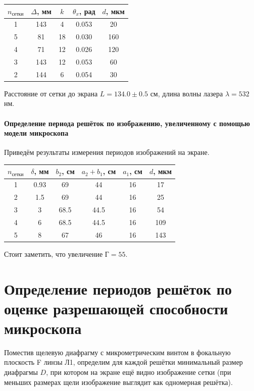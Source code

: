 \documentclass[12pt]{article}
\begin{document}
\begin{table}[h!]
	\centering
	\begin{tabular}{|c|c|c|c|c|}
	\hline
		$n_\text{сетки}$ & $\Delta$, мм & $k$ & $\theta_x$, рад & $d$, мкм\\
	\hline
		1 & 143 & 4 & 0.053 & 20\\
	\hline
		5 & 81 & 18 & 0.030 & 160\\
	\hline
		4 & 71 & 12 & 0.026 & 120\\
	\hline
		3 & 143 & 12 & 0.053 & 60\\
	\hline
		2 & 144 & 6 & 0.054 & 30\\		 	
	\hline
	\end{tabular}
\end{table}
\par
	Расстояние от сетки до экрана $L = 134.0 \pm 0.5$ см, длина волны лазера $\lambda = 532$ нм.
	
\paragraph*{Определение периода решёток по изображению, увеличенному с помощью модели микроскопа}
\par
	Приведём результаты измерения периодов изображений на экране.

\begin{table}[h!]
	\centering
	\begin{tabular}{|c|c|c|c|c|c|}
	\hline
		$n_\text{сетки}$ & $\delta$, мм & $b_2$, см & $a_2 + b_1$, см & $a_1$, см & $d$, мкм\\
	\hline
		1 & 0.93 & 69 & 44 & 16 & 17\\
	\hline
		2 & 1.5 & 69 & 44 & 16 & 25 \\
	\hline
		3 & 3 & 68.5 & 44.5 & 16 & 54  \\
	\hline
		4 & 6 & 68.5 & 44.5 & 16 & 109\\
	\hline
		5 & 8 & 67 & 46 & 16 & 143\\		 	
	\hline
	\end{tabular}
\end{table}
\par
	Стоит заметить, что увеличение $Г = 55$.

\section*{Определение периодов решёток по оценке разрешающей способности микроскопа}
\par
	Поместив щелевую диафрагму с микрометрическим винтом в фокальную плоскость F линзы Л1, определим для каждой решётки минимальный размер диафрагмы $D$, при котором на экране ещё видно изображение сетки (при меньших размерах щели изображение выглядит как одномерная решётка).
\end{document}
